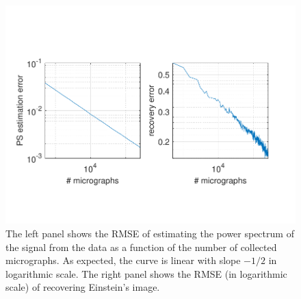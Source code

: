 \documentclass[english,11pt]{article}
\newcommand{\1}{\mathbf{1}}
\newcommand{\TODO}[1]{{\color{red}{[#1]}}}
\numberwithin{equation}{section}
\theoremstyle{plain}
\theoremstyle{definition}
\theoremstyle{remark}
\theoremstyle{plain}
\theoremstyle{remark}
\theoremstyle{plain}
\theoremstyle{plain}
\begin{document}
\begin{figure}[h]
\centering
\includegraphics[scale=.7]{Einstein_progress}
\caption{\label{fig:error_per_micro} The left panel shows the RMSE of estimating the power spectrum of the signal from the data as a function of the number of  collected micrographs. As expected, the curve is linear with slope $-1/2$ in logarithmic scale. The right panel shows the RMSE  (in logarithmic scale) of recovering Einstein's image. \TODO{The program still runs so these figures will be extended to the right (more micrographs).}}	
\end{figure}

%
%
\end{document}
